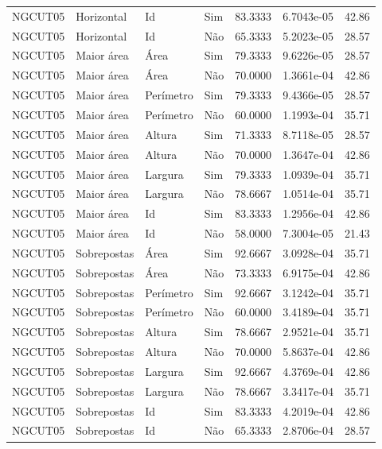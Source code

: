 \begin{tabular}{llllrrr}
    NGCUT05   & Horizontal  & Id        & Sim         & 83.3333      & 6.7043e-05 & 42.86    \\
    NGCUT05   & Horizontal  & Id        & Não         & 65.3333      & 5.2023e-05 & 28.57    \\
    NGCUT05   & Maior área  & Área      & Sim         & 79.3333      & 9.6226e-05 & 28.57    \\
    NGCUT05   & Maior área  & Área      & Não         & 70.0000      & 1.3661e-04 & 42.86    \\
    NGCUT05   & Maior área  & Perímetro & Sim         & 79.3333      & 9.4366e-05 & 28.57    \\
    NGCUT05   & Maior área  & Perímetro & Não         & 60.0000      & 1.1993e-04 & 35.71    \\
    NGCUT05   & Maior área  & Altura    & Sim         & 71.3333      & 8.7118e-05 & 28.57    \\
    NGCUT05   & Maior área  & Altura    & Não         & 70.0000      & 1.3647e-04 & 42.86    \\
    NGCUT05   & Maior área  & Largura   & Sim         & 79.3333      & 1.0939e-04 & 35.71    \\
    NGCUT05   & Maior área  & Largura   & Não         & 78.6667      & 1.0514e-04 & 35.71    \\
    NGCUT05   & Maior área  & Id        & Sim         & 83.3333      & 1.2956e-04 & 42.86    \\
    NGCUT05   & Maior área  & Id        & Não         & 58.0000      & 7.3004e-05 & 21.43    \\
    NGCUT05   & Sobrepostas & Área      & Sim         & 92.6667      & 3.0928e-04 & 35.71    \\
    NGCUT05   & Sobrepostas & Área      & Não         & 73.3333      & 6.9175e-04 & 42.86    \\
    NGCUT05   & Sobrepostas & Perímetro & Sim         & 92.6667      & 3.1242e-04 & 35.71    \\
    NGCUT05   & Sobrepostas & Perímetro & Não         & 60.0000      & 3.4189e-04 & 35.71    \\
    NGCUT05   & Sobrepostas & Altura    & Sim         & 78.6667      & 2.9521e-04 & 35.71    \\
    NGCUT05   & Sobrepostas & Altura    & Não         & 70.0000      & 5.8637e-04 & 42.86    \\
    NGCUT05   & Sobrepostas & Largura   & Sim         & 92.6667      & 4.3769e-04 & 42.86    \\
    NGCUT05   & Sobrepostas & Largura   & Não         & 78.6667      & 3.3417e-04 & 35.71    \\
    NGCUT05   & Sobrepostas & Id        & Sim         & 83.3333      & 4.2019e-04 & 42.86    \\
    NGCUT05   & Sobrepostas & Id        & Não         & 65.3333      & 2.8706e-04 & 28.57    \\
    \hline
\end{tabular}